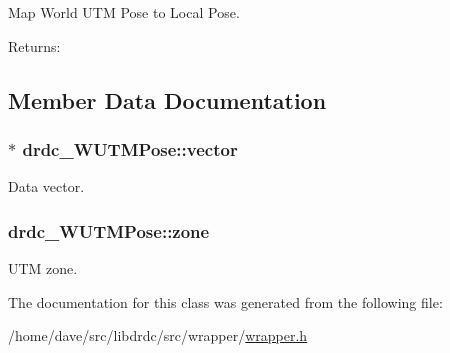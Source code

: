 Map World UTM Pose to Local Pose. 

\begin{Desc}
\item[Returns:]\end{Desc}


\subsection{Member Data Documentation}
\hypertarget{classdrdc__WUTMPose_8dc6dad1cd2224fc414137fb4665cd5d}{
\subsubsection[vector]{$\ast$ {\bf drdc\_\-WUTMPose::vector}}}
\label{classdrdc__WUTMPose_8dc6dad1cd2224fc414137fb4665cd5d}


Data vector. 

\hypertarget{classdrdc__WUTMPose_4596093fb33fafbb1257e54ff17bd13e}{
\subsubsection[zone]{ {\bf drdc\_\-WUTMPose::zone}}}
\label{classdrdc__WUTMPose_4596093fb33fafbb1257e54ff17bd13e}


UTM zone. 



The documentation for this class was generated from the following file:\begin{CompactItemize}
\item 
/home/dave/src/libdrdc/src/wrapper/\hyperlink{wrapper_8h}{wrapper.h}\end{CompactItemize}
